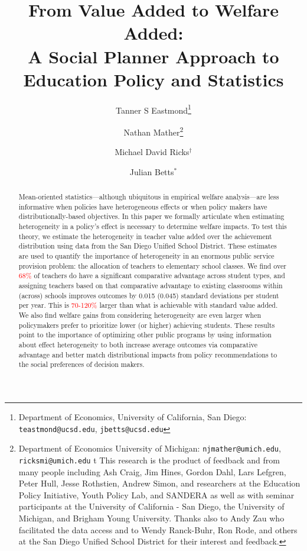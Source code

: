 \documentclass[12pt]{article}
\title{From Value Added to Welfare Added: \\ A Social Planner Approach to Education Policy and Statistics}
\author{Tanner S Eastmond\thanks{Department of Economics, University of California, San Diego: \texttt{teastmond@ucsd.edu}, \texttt{jbetts@ucsd.edu}} \and Nathan Mather\thanks{Department of Economics University of Michigan: \texttt{njmather@umich.edu}, \texttt{ricksmi@umich.edu} \hspace{11em} {\color{white}t} This research is the product of feedback and from many people including Ash Craig, Jim Hines, Gordon Dahl, Lars Lefgren, Peter Hull, Jesse Rothstien,  Andrew Simon, and  researchers at the Education Policy Initiative, Youth Policy Lab, and SANDERA as well as with seminar participants at the University of California - San Diego, the University of Michigan, and Brigham Young University. Thanks also to Andy Zau who facilitated the data access and to  Wendy Ranck-Buhr, Ron Rode, and others at the San Diego Unified School District for their interest and feedback.} \and Michael David Ricks$^\dagger$ \and Julian Betts$^*$}
\theoremstyle{definition}
\theoremstyle{definition}
\theoremstyle{definition}
\theoremstyle{definition}
\begin{document}
\maketitle

\begin{abstract}

Mean-oriented statistics---although ubiquitous in empirical welfare analysis---are less informative when policies have heterogeneous effects or when policy makers have distributionally-based objectives. In this paper we formally articulate when estimating heterogeneity in a policy's effect is necessary to determine welfare impacts. To test this theory, we estimate the heterogeneity in teacher value added over the achievement distribution using data from the San Diego Unified School District. These estimates are used to quantify the importance of heterogeneity in an enormous public service provision problem: the allocation of teachers to elementary school classes. We find over \textcolor{red}{68\%} of teachers do have a significant comparative advantage across student types, and assigning teachers based on that comparative advantage to existing classrooms within (across) schools improves outcomes by 0.015 (0.045) standard deviations per student per year. This is \textcolor{red}{70-120\%} larger than what is achievable with standard value added. We also find welfare gains from considering heterogeneity are even larger when policymakers prefer to prioritize lower (or higher) achieving students. These results point to the importance of optimizing other public programs by using information about effect heterogeneity to both increase average outcomes via comparative advantage and better match distributional impacts from policy recommendations to the social preferences of decision makers. 





\end{abstract}
\end{document}
